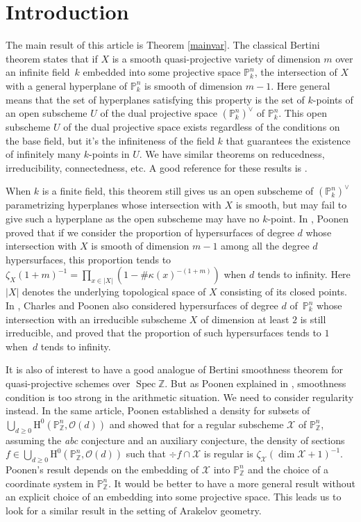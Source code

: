 \documentclass[11pt]{article}
\numberwithin{equation}{section}
\theoremstyle{plain}
\theoremstyle{definition}
\newcommand{\ho}{\mathrm{H}}
\newcommand{\X}{\mathcal{X}}
\newcommand{\Z}{\mathbb{Z}}
\newcommand{\pr}{\mathbb{P}}
\DeclareMathOperator{\Spec}{Spec}
\begin{document}
\section{Introduction}
The main result of this article is Theorem \ref{mainvar}.
The classical Bertini theorem states that if $X$ is a smooth quasi-projective variety of dimension $m$ over an infinite field~$k$ embedded into some projective space $\pr^n_k$, the intersection of $X$ with a general hyper\-plane of $\pr^n_k$ is smooth of dimension $m-1$. Here general means that the set of hyper\-planes satisfying this property is the set of $k$-points of an open subscheme $U$ of the dual projective space $(\pr^n_k)^{\vee}$ of $\pr^n_k$.
This open subscheme $U$ of the dual projective space exists regardless of the conditions on the base field, but it's the infiniteness of the field $k$ that guarantees the existence of infinitely many $k$-points in $U$. We have similar theorems on reducedness, irreducibility, connectedness, etc. A good reference for these results is \cite{Jo83}.

When $k$ is a finite field, this theorem still gives us an open subscheme of $(\pr^n_k)^{\vee}$ parametrizing hyperplanes whose intersection with $X$ is smooth, but may fail to give such a hyperplane as the open subscheme may have no $k$-point. In \cite{Po04}, Poonen proved that if we consider the proportion of hypersurfaces of degree $d$ whose intersection with $X$ is smooth of dimension $m-1$ among all the degree $d$ hypersurfaces, this proportion tends to $\zeta_X(1+m)^{-1}=\prod_{x\in |X|}(1-\#\kappa(x)^{-(1+m)})$ when $d$ tends to infinity. Here $|X|$ denotes the underlying topological space of $X$ consisting of its closed points. In \cite{CP16}, Charles and Poonen also considered hypersurfaces of degree $d$ of~$\pr^n_k$ whose intersection with an irreducible subscheme $X$ of dimension at least $2$ is still irreducible, and proved that the proportion of such hypersurfaces tends to $1$ when~$d$ tends to infinity.

It is also of interest to have a good analogue of Bertini smoothness theorem for quasi-projective schemes over $\Spec \Z$. But as Poonen explained in \cite[\S 5.7]{Po04}, smoothness condition is too strong in the arithmetic situation. We need to consider regularity instead.
In the same article, Poonen established a density for subsets of $\bigcup_{d\geq 0}\ho^0(\pr^n_{\Z}, \mathcal{O}(d))$ and showed that for a regular subscheme $\X$ of $\pr^n_{\Z}$, assum\-ing the \emph{abc} conjecture and an auxiliary conjecture, the density of sections $f\in\bigcup_{d\geq 0}\ho^0(\pr^n_{\Z}, \mathcal{O}(d))$ such that $\div f\cap \X$ is regular is $\zeta_{\X}(\dim \X+1)^{-1}$. Poonen's result depends on the embedding of $\X$ into $\pr^n_{\Z}$ and the choice of a coordinate system in $\pr^n_{\Z}$. It would be better to have a more general result without an explicit choice of an embedding into some projective space. This leads us to look for a similar result in the setting of Arakelov geometry.
\end{document}

